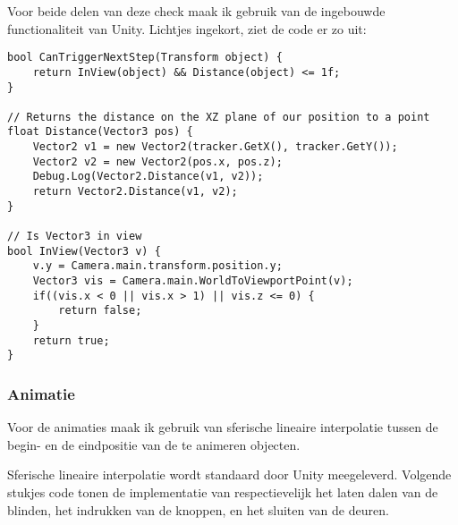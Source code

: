 Voor beide delen van deze check maak ik gebruik van de ingebouwde functionaliteit
van Unity. Lichtjes ingekort, ziet de code er zo uit:

\begin{verbatim}
bool CanTriggerNextStep(Transform object) {
    return InView(object) && Distance(object) <= 1f;
}

// Returns the distance on the XZ plane of our position to a point
float Distance(Vector3 pos) {
    Vector2 v1 = new Vector2(tracker.GetX(), tracker.GetY());
    Vector2 v2 = new Vector2(pos.x, pos.z);
    Debug.Log(Vector2.Distance(v1, v2));
    return Vector2.Distance(v1, v2);
}

// Is Vector3 in view
bool InView(Vector3 v) {
    v.y = Camera.main.transform.position.y;
    Vector3 vis = Camera.main.WorldToViewportPoint(v);
    if((vis.x < 0 || vis.x > 1) || vis.z <= 0) {
        return false;
    }
    return true;
}
\end{verbatim}


\subsubsection{Animatie}
Voor de animaties maak ik gebruik van sferische lineaire interpolatie tussen de
begin- en de eindpositie van de te animeren objecten.

Sferische lineaire interpolatie wordt standaard door Unity meegeleverd. Volgende
stukjes code tonen de implementatie van respectievelijk het laten dalen van de
blinden, het indrukken van de knoppen, en het sluiten van de deuren.

